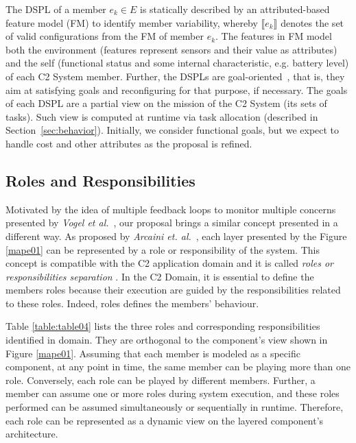 The DSPL of a member $e_k \in E$ is statically described by an attributed-based feature model (FM) to identify member variability, whereby
 $ \llbracket e_k \rrbracket$ denotes the set of valid configurations from the FM of member $e_k$. The features in FM model both the environment (features represent sensors and their value as attributes)  and the self (functional status and some internal characteristic, e.g. battery level) of each C2 System member. Further, the DSPLs are goal-oriented~\cite{BencomoHA12}, that is, they aim at satisfying goals and reconfiguring for that purpose, if necessary. The goals of each DSPL are a partial view on the mission of the C2 System (its sets of tasks). Such  view is computed at runtime via task allocation (described in Section~\ref{sec:behavior}).  Initially, we consider functional goals, but we expect to handle cost and other attributes as the proposal is refined.  


\subsection{Roles and Responsibilities} \label{sec:rolesResponsibilities}
 
Motivated by the idea of multiple feedback loops to monitor multiple concerns presented by \textit{Vogel et al.}~\cite{Vogel01}, our proposal brings a similar concept presented in a different way. As proposed by \textit{Arcaini et. al.}~\cite{MAPE01}, each layer presented by the Figure \ref{mape01} can be represented by a role or responsibility of the system. This concept is compatible with the C2 application domain and it is called \textit{roles or responsibilities separation} \cite{Alberts2000}. In the C2 Domain, it is essential to define the members roles because their execution are guided by the responsibilities related to these roles. Indeed, roles defines the members' behaviour.

Table \ref{table:table04} lists the three roles and corresponding responsibilities identified in domain. They are orthogonal to the component's view shown in Figure \ref{mape01}. Assuming that each member is modeled as a specific component, at any point in time, the same member can be playing more than one role. Conversely, each role can be played by different members. Further, a member can assume one or more roles during system execution, and these roles performed can be assumed simultaneously or sequentially in runtime. Therefore, each role can be represented as a dynamic view on the layered component's architecture.

